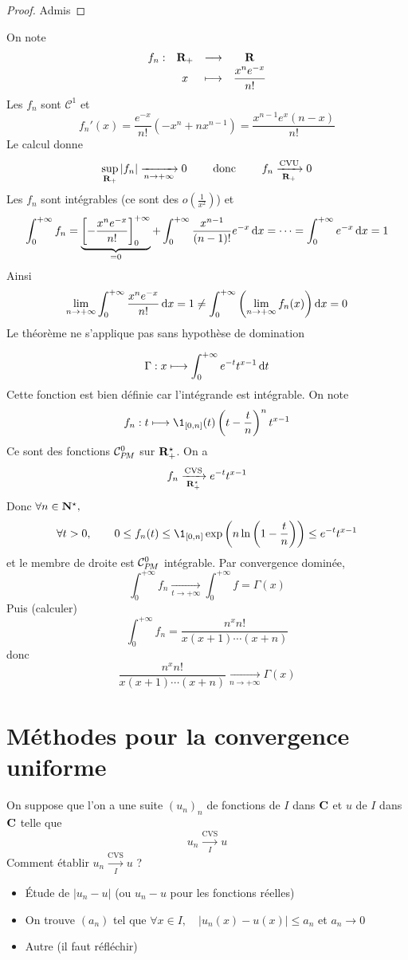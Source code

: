 \begin{proof}
Admis
\end{proof}

\begin{rem}
On note \[
\begin{matrix}
    f_n:& \mathbf R_+ & \longrightarrow &\mathbf R  \\
    & x & \longmapsto & \dfrac{x^ne^{-x}}{n!}
\end{matrix}
\] 
Les $f_n$ sont  $\mathcal  C^1$ et \[
    f_n'(x)=\frac{e^{-x}}{n!}\left( -x^n+nx^{n-1} \right) =\frac{x^{n-1}e^x(n-x)}{n!}
\] 
Le calcul donne \[
    \sup_{\mathbf R_+}|f_n| \xrightarrow[n\to+\infty]{}0 \qquad  \text{ donc } \qquad  f_n \xrightarrow[\mathbf R_+]{\text{CVU}}0
\]
Les $f_n$ sont intégrables (ce sont des $o(\frac{1}{x^2})$) et \[
    \int_0^{+\infty}f_n= \underbrace{\left[ -\frac{x^ne^{-x}}{n!} \right]_0^{+\infty}}_{=0}+\int_0^{+\infty} \frac{x^{n-1}}{(n-1)!}e^{-x}\mathop{}\!\mathrm d x=\cdots =\int_0^{+\infty}e^{-x}\mathop{}\!\mathrm d x=1
\]
Ainsi  \[
    \lim_{n\to +\infty} \int_0^{+\infty} \frac{x^ne^{-x}}{n!}\mathop{}\!\mathrm d x=1 \neq  \int_0^{+\infty} \left( \lim_{n\to +\infty}f_n(x) \right) \mathop{}\!\mathrm d x=0
\] 
Le théorème ne s'applique pas sans hypothèse de domination
\end{rem}

\begin{ex}
\[
\Gamma:x\longmapsto \int_{{0}}^{{+\infty}} {e^{-t}t^{x-1}}\mathop{}\!\mathrm d t
\] 
Cette fonction est bien définie car l'intégrande est intégrable. On note \[
    f_n:t\longmapsto \1_{[0,n]}(t) \left( t-\frac{t}{n} \right) ^nt^{x-1}
\]
Ce sont des fonctions $\CPM$ sur  $\mathbf R_+^\star$. On a \[
    f_n \xrightarrow[\mathbf R_+^\star]{\text{CVS}}e^{-t}t^{x-1}
\]
Donc $\forall  n \in  \mathbf N^\star,$ \[ \forall  t >0, \qquad  0\leq f_n(t)\leq \1_{[0, n]}\exp\left(n \ln \left(1-\frac{t}{n}\right)\right)\leq e^{-t}t^{x-1} \]
et le membre de droite est $\CPM$ intégrable. Par convergence dominée,  \[
    \int_{0}^{+\infty} f_n \xrightarrow[t\to +\infty]{}\int_0^{+\infty}f=\Gamma(x) 
\] 
Puis (calculer) \[
    \int_0^{+\infty}f_n=\frac{n^xn!}{x(x+1)\cdots (x+n)}
\] 
donc \[
    \frac{n^xn!}{x(x+1)\cdots (x+n)} \xrightarrow[n\to+\infty]{}\Gamma(x)
\] 
\end{ex}

\section{Méthodes pour la convergence uniforme}

On suppose que l'on a une suite $(u_n)_n$ de fonctions de  $I$ dans  $\mathbf C$ et $u$ de  $I$ dans  $\mathbf C$ telle que \[
    u_n \xrightarrow[I]{\text{CVS}}u
\]
Comment établir $u_n \xrightarrow[I]{\text{CVS}}u$ ?
\begin{itemize}
    \item Étude de $|u_n-u|$ (ou $u_n-u$ pour les fonctions réelles)
    \item On trouve $(a_n)$ tel que  $\forall  x \in  I, \quad  |u_n(x)-u(x)|\leq a_n$ et $a_n\longrightarrow 0$
    \item Autre (il faut réfléchir)
\end{itemize}

